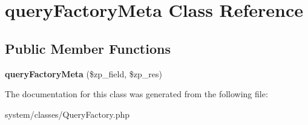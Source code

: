 \hypertarget{classquery_factory_meta}{
\section{queryFactoryMeta Class Reference}
\label{classquery_factory_meta}
}
\subsection*{Public Member Functions}
\begin{DoxyCompactItemize}
\item 
\hypertarget{classquery_factory_meta_a0350771d9b865dc7e1a119093ba83e0e}{
{\bfseries queryFactoryMeta} (\$zp\_\-field, \$zp\_\-res)}
\label{classquery_factory_meta_a0350771d9b865dc7e1a119093ba83e0e}

\end{DoxyCompactItemize}


The documentation for this class was generated from the following file:\begin{DoxyCompactItemize}
\item 
system/classes/QueryFactory.php\end{DoxyCompactItemize}
